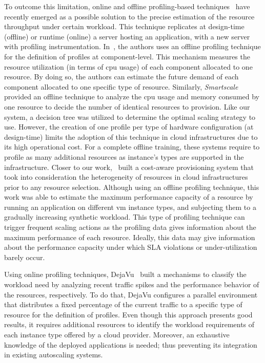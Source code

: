  
To outcome this limitation, online and offline profiling-based techniques~\cite{kaviani_profiling-as--service:_2011} have recently emerged as a possible solution to the precise estimation of the resource throughput under certain workload. This technique replicates at design-time (offline) or runtime (online) a server hosting an application, with a new server with profiling instrumentation. In~\cite{roy_2011}, the authors uses an offline profiling technique for the definition of profiles at component-level. This mechanism measures the resource utilization (in terms of cpu usage) of each component allocated to one resource. By doing so, the authors can estimate the future demand of each component allocated to one specific type of resource. Similarly, \emph{Smartscale}~\cite{smartscale_2012} provided an offline technique to analyze the cpu usage and memory consumed by one resource to decide the number of identical resources to provision. Like our system, a decision tree was utilized to determine the optimal scaling strategy to use. However, the creation of one profile per type of hardware configuration (at design-time) limits the adoption of this technique in cloud infrastructures due to its high operational cost. For a complete offline training, these systems require to profile as many additional resources as instance's types are supported in the infrastructure. Closer to our work,~\cite{sharma_cost-aware_2011} built a cost-aware provisioning system that took into consideration the heterogeneity of resources in cloud infrastructures prior to any resource selection. Although using an offline profiling technique, this work was able to estimate the maximum performance capacity of a resource by running an application on different vm instance types, and subjecting them to a gradually increasing synthetic workload. This type of profiling technique can trigger frequent scaling actions as the profiling data gives information about the maximum performance of each resource. Ideally, this data may give information about the performance capacity under which SLA violations or under-utilization barely occur.

Using online profiling techniques, DejaVu~\cite{dejavu2012}  built a mechanisms to classify the workload need by analyzing recent traffic spikes and the performance behavior of the resources, respectively. To do that, DejaVu configures a parallel environment that distributes a fixed percentage of the current traffic to a specific type of resource for the definition of profiles. Even though this approach presents good results, it requires additional resources to identify the workload requirements of each instance type offered by a cloud provider. Moreover, an exhaustive knowledge of the deployed applications is needed; thus preventing its integration in existing autoscaling systems.  


